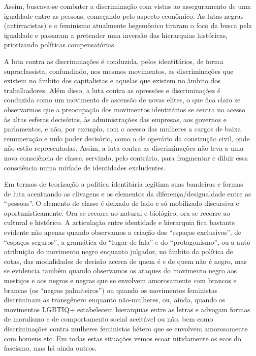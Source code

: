 Assim, buscava-se combater a discriminação com vistas ao asseguramento
de uma igualdade entre as pessoas, começando pelo aspecto econômico. As
lutas negras (antirracistas) e o feminismo atualmente hegemônico tiraram
o foco da busca pela igualdade e passaram a pretender uma inversão das
hierarquias históricas, priorizando políticas compensatórias.

A luta contra as discriminações é conduzida, pelos identitários, de
forma supraclassista, confundindo, nos mesmos movimentos, as
discriminações que existem no âmbito dos capitalistas e aquelas que
existem no âmbito dos trabalhadores. Além disso, a luta contra as
opressões e discriminações é conduzida como um movimento de ascensão de
novas elites, o que fica claro se observarmos que a preocupação dos
movimentos identitários se centra no acesso às altas esferas decisórias,
às administrações das empresas, aos governos e parlamentos, e não, por
exemplo, com o acesso das mulheres a cargos de baixa remuneração e nulo
poder decisório, como o de operário da construção civil, onde não estão
representadas. Assim, a luta contra as discriminações não leva a uma
nova consciência de classe, servindo, pelo contrário, para fragmentar e
diluir essa consciência numa miríade de identidades excludentes.

Em termos de teorização a política identitária legitima suas bandeiras e
formas de luta acentuando as clivagens e os elementos da
diferença/desigualdade entre as ``pessoas''. O elemento de classe é
deixado de lado e só mobilizado discursiva e oportunisticamente. Ora se
recorre ao natural e biológico, ora se recorre ao cultural e histórico.
A articulação entre identidade e hierarquia fica bastante evidente não
apenas quando observamos a criação dos ``espaços exclusivos'', de
``espaços seguros'', a gramática do ``lugar de fala'' e do
``protagonismo'', ou a auto atribuição do movimento negro enquanto
julgador, no âmbito da política de cotas, das modalidades de decisão
acerca de quem é e de quem não é negro, mas se evidencia também quando
observamos os ataques do movimento negro aos mestiços e aos negros e
negras que se envolvem amorosamente com brancos e brancas (os ``negros
palmiteiros'') ou quando os movimentos feministas discriminam as
transgênero enquanto não-mulheres, ou, ainda, quando os movimentos
LGBTIQ+ estabelecem hierarquias entre as letras e advogam formas de
moralismo e de comportamento social aceitável ou não, bem como
discriminações contra mulheres feministas hétero que se envolvem
amorosamente com homens etc. Em todas estas situações vemos ecoar
nitidamente os ecos do fascismo, mas há ainda outros.


